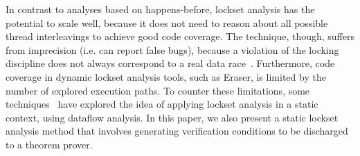 In contrast to analyses based on happens-before, lockset analysis has the potential to scale well, because it does not need to reason about all possible thread interleavings to achieve good code coverage. The technique, though, suffers from imprecision (i.e. can report false bugs), because a violation of the locking discipline does not always correspond to a real data race~\cite{savage1997eraser, pozniansky2003efficient, o2003hybrid, elmas2007goldilocks, flanagan2009fasttrack}. Furthermore, code coverage in dynamic lockset analysis tools, such as Eraser, is limited by the number of explored execution paths. To counter these limitations, some techniques~\cite{pratikakis2006locksmith, voung2007relay} have explored the idea of applying lockset analysis in a static context, using dataflow analysis. In this paper, we also present a static lockset analysis method that involves generating verification conditions to be discharged to a theorem prover.
